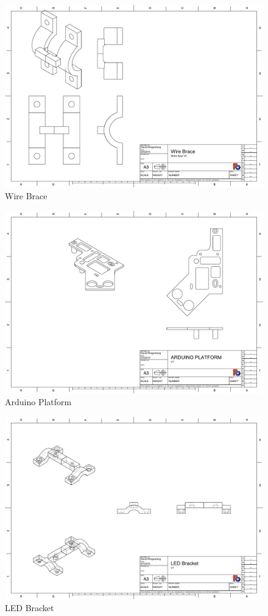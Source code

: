 \documentclass[pdftex,11pt]{article}
\begin{document}
\begin{figure}[!h]
	\centering
		\includegraphics[width=1\textwidth]{./graphics/wire_brace_lowerclamp-eps-converted-to.pdf}
	\caption{Wire Brace}
	\label{fig:wirebrace}
\end{figure}

\begin{figure}[!h]
	\centering
		\includegraphics[width=1\textwidth]{./graphics/arduino_platformv7-eps-converted-to.pdf}
	\caption{Arduino Platform}
	\label{fig:arduinoplatform}
\end{figure}

\begin{figure}[!h]
	\centering
		\includegraphics[width=1\textwidth]{./graphics/LED_Bracket-eps-converted-to.pdf}
	\caption{LED Bracket}
	\label{fig:arduinoplatform}
\end{figure}
\end{document}
